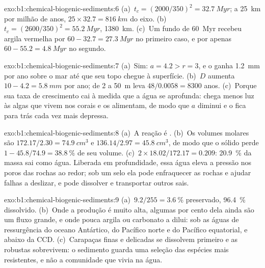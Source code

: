 \begin{solution}{exo:b1:chemical-biogenic-sediments:6}
(a)~$t_c = (2000/350)^2 = \qty{32.7}{Myr}$; a \qty{25}{km} por milhão de anos,
$25\times32.7 = \qty{816}{km}$ do eixo. (b)~$t_c = (2600/350)^2 =
\qty{55.2}{Myr}$, \qty{1380}{km}. (c)~Um fundo de \qty{60}{Myr} recebeu argila
vermelha por $60 - 32.7 = \qty{27.3}{Myr}$ no primeiro caso, e por apenas
$60 - 55.2 = \qty{4.8}{Myr}$ no segundo.
\end{solution}

\begin{solution}{exo:b1:chemical-biogenic-sediments:7}
(a)~Sim: $a = 4.2 > r = 3$, e o  ganha \qty{1.2}{mm} por ano sobre o mar
até que seu topo chegue à superfície. (b)~$D$ aumenta $10 - 4.2 = \qty{5.8}{mm}$ por
ano; de 2 a \qty{50}{m} leva $48/0.0058 = \num{8300}$ anos. (c)~Porque
sua taxa de crescimento cai à medida que a água se aprofunda: chega menos luz às algas
que vivem nos corais e os alimentam, de modo que $a$ diminui e o  fica para trás
cada vez mais depressa.
\end{solution}

\begin{solution}{exo:b1:chemical-biogenic-sediments:8}
(a)~A reação é . (b)~Os volumes molares são $172.17/2.30 =
\qty{74.9}{cm^3}$ e $136.14/2.97 = \qty{45.8}{cm^3}$, de modo que o sólido perde
$1 - 45.8/74.9 = \qty{38.8}{\%}$ de seu volume. (c)~$2\times18.02/172.17 = 0.209$:
\qty{20.9}{\%} da massa sai como água. Liberada em profundidade, essa água eleva a pressão
nos poros das rochas ao redor; sob um selo ela pode enfraquecer as rochas e ajudar falhas
a deslizar, e pode dissolver e transportar outros sais.
\end{solution}

\begin{solution}{exo:b1:chemical-biogenic-sediments:9}
(a)~$9.2/255 = \qty{3.6}{\%}$ preservado, \qty{96.4}{\%} dissolvido. (b)~Onde a
produção é muito alta, algumas por cento dela ainda são um fluxo grande, e onde pouca
argila ou carbonato a dilui: sob as águas de ressurgência do oceano Antártico, do Pacífico
norte e do Pacífico equatorial, e abaixo da CCD. (c)~Carapaças finas e delicadas se
dissolvem primeiro e as robustas sobrevivem: o sedimento guarda uma seleção das espécies
mais resistentes, e não a comunidade que vivia na água.
\end{solution}

